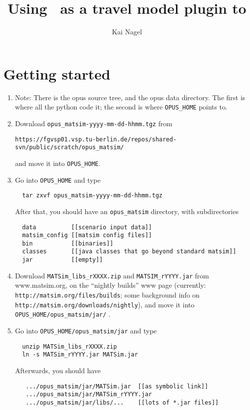 \documentclass{article}
\title{Using \matsim\ as a travel model plugin to \urbansim}
\author{Kai Nagel}
\begin{document}

\maketitle

\section{Getting started}

\begin{enumerate}

\item Note: There is the opus source tree, and the opus data directory.
The first is where all the python code it; the second is where
\verb#OPUS_HOME# points to.

\item Download \verb#opus_matsim-yyyy-mm-dd-hhmm.tgz# from

\verb$https://fgvsp01.vsp.tu-berlin.de/repos/shared-svn/public/scratch/opus_matsim/$

and move it into \verb#OPUS_HOME#.

\item Go into \verb#OPUS_HOME# and type
\begin{verbatim}
  tar zxvf opus_matsim-yyyy-mm-dd-hhmm.tgz
\end{verbatim}

After that, you should have an \verb$opus_matsim$ directory, with
subdirectories
\begin{verbatim}
  data          [[scenario input data]]
  matsim_config [[matsim config files]]
  bin           [[binaries]]
  classes       [[java classes that go beyond standard matsim]]
  jar           [[empty]]
\end{verbatim}

\item Download \verb$MATSim_libs_rXXXX.zip$ and
\verb$MATSIM_rYYYY.jar$ from www.matsim.org, on the ``nightly builds''
www page (currently: \verb$http://matsim.org/files/builds$; some
background info on \verb$http://matsim.org/downloads/nightly$), and
move it into \verb$OPUS_HOME/opus_matsim/jar/$ .

\item Go into \verb$OPUS_HOME/opus_matsim/jar$ and type
\begin{verbatim}
  unzip MATSim_libs_rXXXX.zip
  ln -s MATSim_rYYYY.jar MATSim.jar
\end{verbatim}
Afterwards, you should have
\begin{verbatim}
   .../opus_matsim/jar/MATSim.jar  [[as symbolic link]]
   .../opus_matsim/jar/MATSim_rYYYY.jar
   .../opus_matsim/jar/libs/...    [[lots of *.jar files]]
\end{verbatim}


\end{enumerate}
\end{document}
